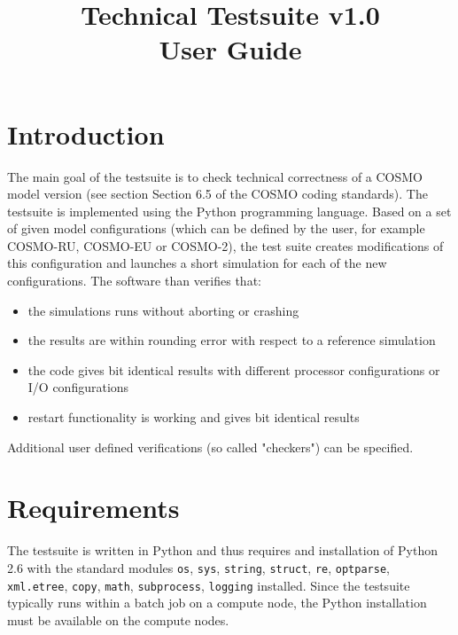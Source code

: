 \documentclass[12pt,twoside,a4paper]{report}
\title{Technical Testsuite v1.0\\User Guide}
\begin{document}
\maketitle
\setcounter{tocdepth}{1}
\tableofcontents 

\section{Introduction}

The main goal of the testsuite is to check technical correctness of a COSMO model version (see section Section 6.5 of the COSMO coding standards). The testsuite is implemented using the Python programming language.
Based on a set of given model configurations (which can be defined by the user, for example COSMO-RU, COSMO-EU or COSMO-2), the test suite creates modifications of this configuration and launches a short simulation for each of the new configurations. The software than verifies that:
\begin{itemize}
\item the simulations runs without aborting or crashing
\item the results are within rounding error with respect to a reference simulation
\item the code gives bit identical results with different processor configurations or I/O configurations
\item restart functionality is working and gives bit identical results
\end{itemize}

Additional user defined verifications (so called "checkers") can be specified.

\section{Requirements}

The testsuite is written in Python and thus requires and installation of Python 2.6 with the standard modules \texttt{os}, \texttt{sys}, \texttt{string}, \texttt{struct}, \texttt{re}, \texttt{optparse}, \texttt{xml.etree}, \texttt{copy}, \texttt{math}, \texttt{subprocess}, \texttt{logging} installed. Since the testsuite typically runs within a batch job on a compute node, the Python installation must be available on the compute nodes.

\end{document}
